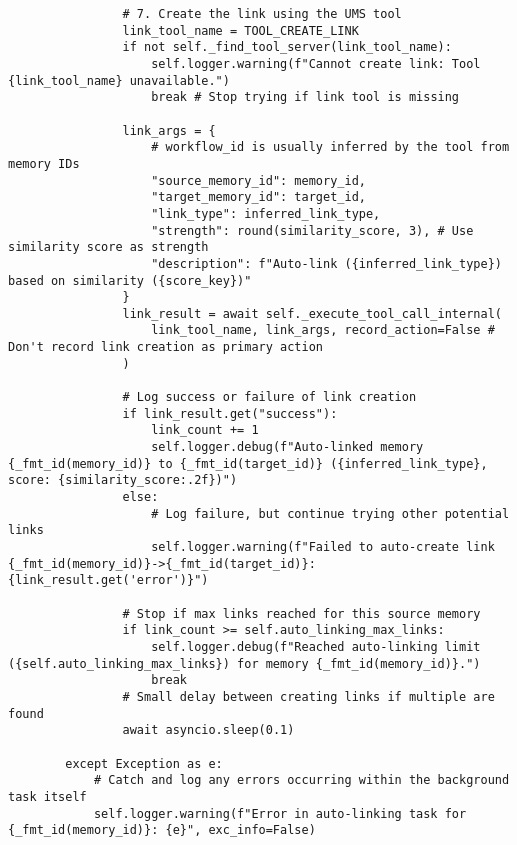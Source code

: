 \documentclass[12pt,a4paper]{article}
\begin{document}
\begin{pageablecode}
\begin{verbatim}
                # 7. Create the link using the UMS tool
                link_tool_name = TOOL_CREATE_LINK
                if not self._find_tool_server(link_tool_name):
                    self.logger.warning(f"Cannot create link: Tool {link_tool_name} unavailable.")
                    break # Stop trying if link tool is missing

                link_args = {
                    # workflow_id is usually inferred by the tool from memory IDs
                    "source_memory_id": memory_id,
                    "target_memory_id": target_id,
                    "link_type": inferred_link_type,
                    "strength": round(similarity_score, 3), # Use similarity score as strength
                    "description": f"Auto-link ({inferred_link_type}) based on similarity ({score_key})"
                }
                link_result = await self._execute_tool_call_internal(
                    link_tool_name, link_args, record_action=False # Don't record link creation as primary action
                )

                # Log success or failure of link creation
                if link_result.get("success"):
                    link_count += 1
                    self.logger.debug(f"Auto-linked memory {_fmt_id(memory_id)} to {_fmt_id(target_id)} ({inferred_link_type}, score: {similarity_score:.2f})")
                else:
                    # Log failure, but continue trying other potential links
                    self.logger.warning(f"Failed to auto-create link {_fmt_id(memory_id)}->{_fmt_id(target_id)}: {link_result.get('error')}")

                # Stop if max links reached for this source memory
                if link_count >= self.auto_linking_max_links:
                    self.logger.debug(f"Reached auto-linking limit ({self.auto_linking_max_links}) for memory {_fmt_id(memory_id)}.")
                    break
                # Small delay between creating links if multiple are found
                await asyncio.sleep(0.1)

        except Exception as e:
            # Catch and log any errors occurring within the background task itself
            self.logger.warning(f"Error in auto-linking task for {_fmt_id(memory_id)}: {e}", exc_info=False)



\end{verbatim}
\end{pageablecode}
\end{document}
